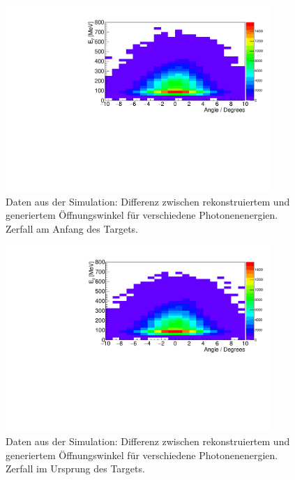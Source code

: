 \documentclass[a4paper,11pt,oneside,final,german,openbib,pdftex]{scrbook}
\begin{document}
{\begin{appendix}
\begin{figure}[h!]
	\begin{center}
		\includegraphics[width=100mm]{OeffZVertex/20170205DiffOeffZVertex-4}
		\caption[Simulation: Differenz zwischen rek. und gen. \"Offnungswinkel: Zerfall am Anfang des Targets]{Daten aus der Simulation: Differenz zwischen rekonstruiertem und generiertem \"Offnungswinkel f\"ur verschiedene Photonenenergien. Zerfall am Anfang des Targets.}
		\label{fig:OeffZVertex-4}
	
	\end{center}
\end{figure}

\begin{figure}[h!]
	\begin{center}
		\includegraphics[width=100mm]{OeffZVertex/20170205DiffOeffZVertexUrsprung}
		\caption[Simulation: Differenz zwischen rek. und gen. \"Offnungswinkel: Zerfall im Ursprung des Targets]{Daten aus der Simulation: Differenz zwischen rekonstruiertem und generiertem \"Offnungswinkel f\"ur verschiedene Photonenenergien. Zerfall im Ursprung des Targets.}
		\label{fig:OeffZVertex0}
		
	\end{center}
\end{figure}


\end{appendix}}
\end{document}
